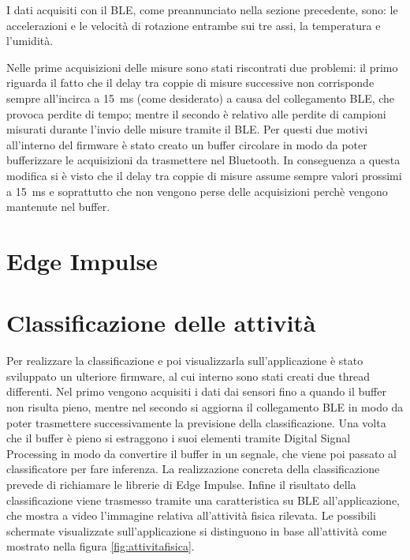 I dati acquisiti con il BLE, come preannunciato nella sezione precedente, sono: le accelerazioni e le velocità di rotazione entrambe sui tre assi, la temperatura e l'umidità.

Nelle prime acquisizioni delle misure sono stati riscontrati due problemi: il primo riguarda il fatto che il delay tra coppie di misure successive non corrisponde sempre all'incirca a \SI{15}{\milli\second} (come desiderato) a causa del collegamento BLE, che provoca perdite di tempo; mentre il secondo è relativo alle perdite di campioni  misurati durante l'invio delle misure tramite il BLE. Per questi due motivi all'interno del firmware è stato creato un buffer circolare in modo da poter bufferizzare le acquisizioni da trasmettere nel Bluetooth. In conseguenza a questa modifica si è visto che il delay tra coppie di misure assume sempre valori prossimi a \SI{15}{\milli\second} e soprattutto che non vengono perse delle acquisizioni perchè vengono mantenute nel buffer.



\section{Edge Impulse}

\section{Classificazione delle attività}
Per realizzare la classificazione e poi visualizzarla sull'applicazione è stato sviluppato un ulteriore firmware, al cui interno sono stati creati due thread differenti. Nel primo vengono acquisiti i dati dai sensori fino a quando il buffer non risulta pieno, mentre nel secondo si aggiorna il collegamento BLE in modo da poter trasmettere successivamente la previsione della classificazione. Una volta che il buffer è pieno si estraggono i suoi elementi tramite Digital Signal Processing in modo da convertire il buffer in un segnale, che viene poi passato al classificatore per fare inferenza. La realizzazione concreta della classificazione prevede di richiamare le librerie di Edge Impulse. Infine il risultato della classificazione viene trasmesso tramite una caratteristica su BLE all'applicazione, che mostra a video l'immagine relativa all'attività fisica rilevata. Le possibili schermate visualizzate sull'applicazione si distinguono in base all'attività come mostrato nella figura \ref{fig:attivitafisica}.

